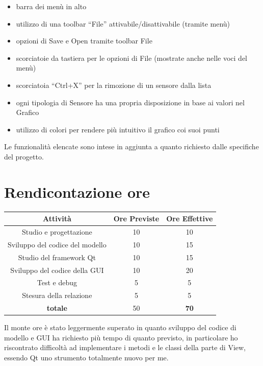 \documentclass{article}
\begin{document}
 \begin{itemize}
    \item barra dei menù in alto 
    \item utilizzo di una toolbar “File” attivabile/disattivabile (tramite menù)
    \item opzioni di Save e Open tramite toolbar File
    \item scorciatoie da tastiera per le opzioni di File (mostrate anche nelle voci del menù)
    \item scorciatoia “Ctrl+X” per la rimozione di un sensore dalla lista
    \item ogni tipologia di Sensore ha una propria disposizione in base ai valori nel Grafico
    \item utilizzo di colori per rendere più intuitivo il grafico coi suoi punti
\end{itemize}

Le funzionalità elencate sono intese in aggiunta a quanto richiesto dalle specifiche del progetto.

 \section{Rendicontazione ore}

\begin{tabular}{|c|c|c|}
    \hline
    \textbf{Attività} & \textbf{Ore Previste} & \textbf{Ore Effettive}\\
    \hline
    Studio e progettazione & 10 & 10 \\
    \hline
    Sviluppo del codice del modello & 10 & 15 \\
    \hline
    Studio del framework Qt & 10 & 15\\
    \hline
    Sviluppo del codice della GUI & 10 & 20\\
    \hline
    Test e debug & 5 & 5\\
    \hline
    Stesura della relazione & 5 & 5\\
    \hline
    \textbf{totale} & 50 & \textbf{70}\\
    \hline
\end{tabular}

\vspace{1em}

 Il monte ore è stato leggermente superato in quanto sviluppo del codice di modello e GUI ha richiesto più tempo di quanto previsto, in particolare ho riscontrato difficoltà ad implementare i metodi e le classi della parte di View, essendo Qt uno strumento totalmente nuovo per me.
\end{document}
